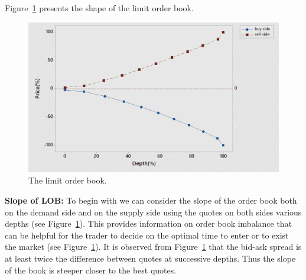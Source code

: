 Figure~\ref{fig:presentshape} presents the shape of the limit order book. 
	\begin{figure}[H]
	\centering
	\includegraphics[width=1.0\textwidth]{chapters/chapter_trade_data_models/figures/lobshape.png} 
	\caption{The limit order book. \label{fig:presentshape}}
	\end{figure}


\noindent \textbf{Slope of LOB:} To begin with we can consider the slope of the order book both on the demand side and on the supply side using the quotes on both sides various depths (see Figure~\ref{fig:presentshape}). This provides information on order book imbalance that can be helpful for the trader to decide on the optimal time to enter or to exist the market (see Figure~\ref{fig:presentshape}). It is observed from Figure~\ref{fig:presentshape} that the bid-ask spread is at least twice the difference between quotes at successive depths. Thus the slope of the book is steeper closer to the best quotes. \\


